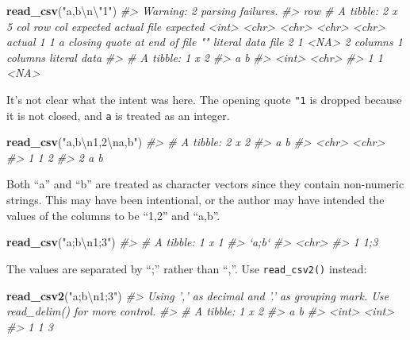 \documentclass[]{book}
\newenvironment{Shaded}{\begin{snugshade}}{\end{snugshade}}
\newcommand{\CharTok}[1]{\textcolor[rgb]{0.31,0.60,0.02}{#1}}
\newcommand{\CommentTok}[1]{\textcolor[rgb]{0.56,0.35,0.01}{\textit{#1}}}
\newcommand{\KeywordTok}[1]{\textcolor[rgb]{0.13,0.29,0.53}{\textbf{#1}}}
\newcommand{\NormalTok}[1]{#1}
\newcommand{\StringTok}[1]{\textcolor[rgb]{0.31,0.60,0.02}{#1}}
\theoremstyle{plain}
\theoremstyle{remark}
\theoremstyle{definition}
\theoremstyle{definition}
\theoremstyle{definition}
\theoremstyle{remark}
\begin{document}
\begin{Shaded}
\begin{Highlighting}[]
\KeywordTok{read_csv}\NormalTok{(}\StringTok{"a,b}\CharTok{\textbackslash{}n\textbackslash{}"}\StringTok{1"}\NormalTok{)}
\CommentTok{#> Warning: 2 parsing failures.}
\CommentTok{#> row # A tibble: 2 x 5 col     row col   expected                     actual    file         expected   <int> <chr> <chr>                        <chr>     <chr>        actual 1     1 a     closing quote at end of file ""        literal data file 2     1 <NA>  2 columns                    1 columns literal data}
\CommentTok{#> # A tibble: 1 x 2}
\CommentTok{#>       a b    }
\CommentTok{#>   <int> <chr>}
\CommentTok{#> 1     1 <NA>}
\end{Highlighting}
\end{Shaded}

It's not clear what the intent was here. The opening quote \texttt{"1}
is dropped because it is not closed, and \texttt{a} is treated as an
integer.

\begin{Shaded}
\begin{Highlighting}[]
\KeywordTok{read_csv}\NormalTok{(}\StringTok{"a,b}\CharTok{\textbackslash{}n}\StringTok{1,2}\CharTok{\textbackslash{}n}\StringTok{a,b"}\NormalTok{)}
\CommentTok{#> # A tibble: 2 x 2}
\CommentTok{#>   a     b    }
\CommentTok{#>   <chr> <chr>}
\CommentTok{#> 1 1     2    }
\CommentTok{#> 2 a     b}
\end{Highlighting}
\end{Shaded}

Both ``a'' and ``b'' are treated as character vectors since they contain
non-numeric strings. This may have been intentional, or the author may
have intended the values of the columns to be ``1,2'' and ``a,b''.

\begin{Shaded}
\begin{Highlighting}[]
\KeywordTok{read_csv}\NormalTok{(}\StringTok{"a;b}\CharTok{\textbackslash{}n}\StringTok{1;3"}\NormalTok{)}
\CommentTok{#> # A tibble: 1 x 1}
\CommentTok{#>   `a;b`}
\CommentTok{#>   <chr>}
\CommentTok{#> 1 1;3}
\end{Highlighting}
\end{Shaded}

The values are separated by ``;'' rather than ``,''. Use
\texttt{read\_csv2()} instead:

\begin{Shaded}
\begin{Highlighting}[]
\KeywordTok{read_csv2}\NormalTok{(}\StringTok{"a;b}\CharTok{\textbackslash{}n}\StringTok{1;3"}\NormalTok{)}
\CommentTok{#> Using ',' as decimal and '.' as grouping mark. Use read_delim() for more control.}
\CommentTok{#> # A tibble: 1 x 2}
\CommentTok{#>       a     b}
\CommentTok{#>   <int> <int>}
\CommentTok{#> 1     1     3}
\end{Highlighting}
\end{Shaded}
\end{document}

